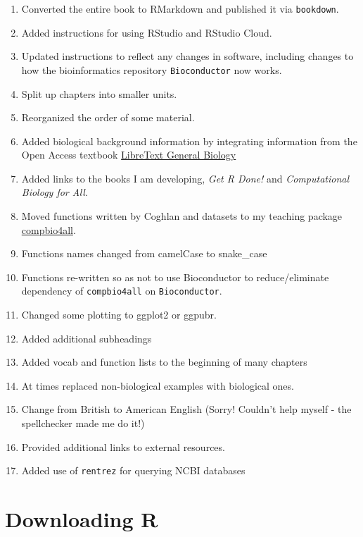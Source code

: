 \documentclass[
]{book}
\newcommand{\passthrough}[1]{#1}
\providecommand{\tightlist}{%
  \setlength{\itemsep}{0pt}\setlength{\parskip}{0pt}}
\begin{document}
\begin{enumerate}
\def\labelenumi{\arabic{enumi}.}
\tightlist
\item
  Converted the entire book to RMarkdown and published it via \passthrough{\lstinline!bookdown!}.
\item
  Added instructions for using RStudio and RStudio Cloud.
\item
  Updated instructions to reflect any changes in software, including changes to how the bioinformatics repository \passthrough{\lstinline!Bioconductor!} now works.
\item
  Split up chapters into smaller units.
\item
  Reorganized the order of some material.
\item
  Added biological background information by integrating information from the Open Access textbook \href{https://bio.libretexts.org/Bookshelves/Introductory_and_General_Biology/Book\%3A_General_Biology_(OpenStax)}{LibreText General Biology}
\item
  Added links to the books I am developing, \emph{Get R Done!} and \emph{Computational Biology for All}.
\item
  Moved functions written by Coghlan and datasets to my teaching package \href{https://github.com/brouwern/compbio4all}{compbio4all}.
\item
  Functions names changed from camelCase to snake\_case
\item
  Functions re-written so as not to use Bioconductor to reduce/eliminate dependency of \passthrough{\lstinline!compbio4all!} on \passthrough{\lstinline!Bioconductor!}.
\item
  Changed some plotting to ggplot2 or ggpubr.
\item
  Added additional subheadings
\item
  Added vocab and function lists to the beginning of many chapters
\item
  At times replaced non-biological examples with biological ones.
\item
  Change from British to American English (Sorry! Couldn't help myself - the spellchecker made me do it!)
\item
  Provided additional links to external resources.
\item
  Added use of \passthrough{\lstinline!rentrez!} for querying NCBI databases
\end{enumerate}

\hypertarget{downloadR}{%
\chapter{Downloading R}\label{downloadR}}
\end{document}
